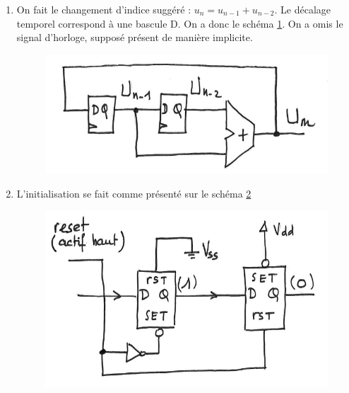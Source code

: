 \documentclass[a4paper,11pt]{article}
\begin{document}
\begin{enumerate}

  \item On fait le changement d'indice suggéré : $u_n=u_{n-1}+u_{n-2}$. Le décalage temporel correspond à une bascule D. On a donc le schéma \ref{fibo1}.
  On a omis le signal d'horloge, supposé présent de manière implicite.

  \begin{figure}[H]
    \begin{center}
      \includegraphics[scale=0.3]{./figures/fibo1.png}
      \label{fibo1}
    \end{center}

 \end{figure}

  \item L'initialisation se fait comme présenté sur le schéma \ref{fibo2}
  \begin{figure}[H]
    \begin{center}
      \includegraphics[scale=0.3]{./figures/fibo2.png}
      \label{fibo2}
    \end{center}

  \end{figure}


\end{enumerate}
\end{document}
